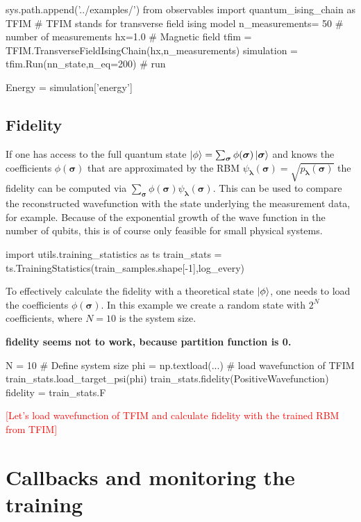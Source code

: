 \documentclass[submission, Phys]{SciPost}
\begin{document}
\begin{python}
sys.path.append('../examples/')
from observables import quantum_ising_chain as TFIM
# TFIM stands for transverse field ising model
n_measurements= 50 # number of measurements
hx=1.0             # Magnetic field
tfim = TFIM.TransverseFieldIsingChain(hx,n_measurements)
simulation = tfim.Run(nn_state,n_eq=200) # run 

Energy = simulation['energy']
\end{python}

\subsection{Fidelity}

If one has access to the full quantum state $\ket{\phi} = \sum_{\bm{\sigma}} \phi(\bm{\sigma}) \ket{ \bm{\sigma}}$ and knows the coefficients $\phi(\bm{\sigma})$ that are approximated by the RBM $\psi_{\bm{\lambda}}(\bm{\sigma}) = \sqrt{p_{\bm{\lambda}}(\bm{\sigma})}$ the fidelity can be computed via $\sum_{\bm{\sigma}} \phi(\bm{\sigma}) \psi_{\bm{\lambda}}(\bm{\sigma})$. This can be used to compare the reconstructed wavefunction with the state underlying the measurement data, for example.
Because of the exponential growth of the wave function in the number of qubits, this is of course only feasible for small physical systems.
\begin{python}
import utils.training_statistics as ts
train_stats = ts.TrainingStatistics(train_samples.shape[-1],log_every)
\end{python}
To effectively calculate the fidelity with a theoretical state $\ket{\phi}$, one needs to load the coefficients $\phi(\bm{\sigma})$. In this example we create a random state with $2^N$ coefficients, where $N=10$ is the system size.

\textbf{fidelity seems not to work, because partition function is 0.}

\begin{python}
N = 10 # Define system size
phi =  np.textload(...) # load wavefunction of TFIM
train_stats.load_target_psi(phi)
train_stats.fidelity(PositiveWavefunction)
fidelity = train_stats.F
\end{python}

\textcolor{red}{[Let's load wavefunction of TFIM and calculate fidelity with the trained RBM from TFIM]}

\section{Callbacks and monitoring the training}
\label{Sec:Callbacks}
\end{document}
